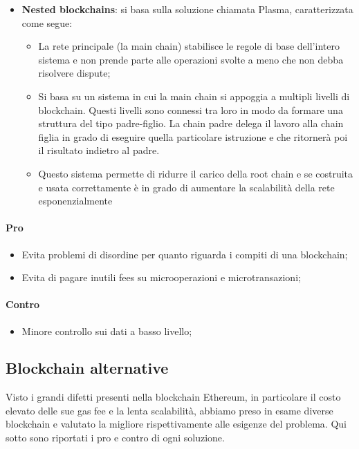     \begin{itemize}
        \item \textbf{Nested blockchains}: si basa sulla soluzione chiamata Plasma, caratterizzata come segue:
        \begin{itemize}
            \item La rete principale (la main chain) stabilisce le regole di base dell'intero sistema e non prende parte alle operazioni svolte a meno che non debba risolvere dispute;
            \item Si basa su un sistema in cui la main chain si appoggia a multipli livelli di blockchain. Questi livelli sono connessi tra loro in modo da formare una struttura del tipo padre-figlio. 
            La chain padre delega il lavoro alla chain figlia in grado di eseguire quella particolare istruzione e che ritornerà poi il risultato indietro al padre.
            \item Questo sistema permette di ridurre il carico della root chain e se costruita e usata correttamente è in grado di aumentare la scalabilità della rete esponenzialmente     
        \end{itemize}
    \end{itemize}
    \paragraph{Pro}
    \begin{itemize}
        \item Evita problemi di disordine per quanto riguarda i compiti di una blockchain;
        \item Evita di pagare inutili fees su microoperazioni e microtransazioni;
    \end{itemize}
    \paragraph{Contro}
    \begin{itemize}
        \item Minore controllo sui dati a basso livello;        
    \end{itemize}

	\subsection{Blockchain alternative}
	Visto i grandi difetti presenti nella blockchain Ethereum\glo{}, in particolare il costo elevato delle sue gas fee e la lenta scalabilità, abbiamo preso in esame diverse blockchain e valutato la migliore 
	rispettivamente alle esigenze del problema. Qui sotto sono riportati i pro e contro di ogni soluzione.
